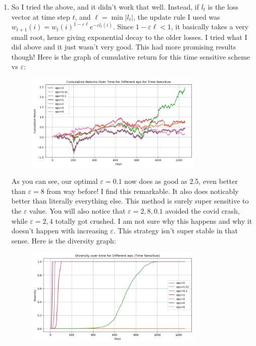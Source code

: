 \documentclass[12pt]{article}
\def\ve{\varepsilon}
\begin{document}
\begin{enumerate}[label=(\alph*)]
        \item So I tried the above, and it didn't work that well. Instead, if $l_t$ is the loss vector at time step $t$, and $\ell = \min |l_t|$, the update rule I used was $w_{t+1}(i) = w_t(i)^{1-\ve \ell} e^{-\ve l_t(i)}$. Since $1-\ve \ell < 1$, it basically takes a very small root, hence giving exponential decay to the older losses. I tried what I did above and it just wasn't very good. This had more promising results though! Here is the graph of cumulative return for this time sensitive scheme vs $\ve$:
        \begin{figure}[H]
            \centering
            \includegraphics[width=0.8\textwidth]{cum_returns_diff_eps_time_sensitive.png}
        \end{figure}
        As you can see, our optimal $\ve = 0.1$ now does as good as 2.5, even better than $\ve = 8$ from way before! I find this remarkable. It also does noticably better than literally everything else. This method is surely super sensitive to the $\ve$ value. You will also notice that $\ve = 2,8,0.1$ avoided the covid crash, while $\ve = 2,4$ totally got crushed. I am not sure why this happens and why it doesn't happen with increasing $\ve$. This strategy isn't super stable in that sense. Here is the diversity graph:
        \begin{figure}[H]
            \centering
            \includegraphics[width=0.8\textwidth]{diversity_graph_time_sensitive.png}

\end{figure}
\end{enumerate}
\end{document}

